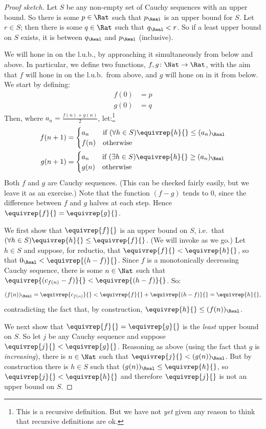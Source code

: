 \documentclass[../../../include/open-logic-section]{subfiles}
\begin{document}
\begin{proof}[Proof sketch] Let $S$ be any non-empty set of Cauchy
sequences with an upper bound. So there is some $p \in \Rat$ such that
$p_{\Real}$ is an upper bound for $S$. Let $r \in S$; then there is
some $q \in \Rat$ such that $q_{\Real} < r$. So if a least upper bound
on $S$ exists, it is between $q_\Real$ and $p_\Real$ (inclusive). 

We will hone in on the l.u.b., by approaching it simultaneously from
below and above. In particular, we define two functions, $f, g \colon
\Nat \to \Rat$, with the aim that $f$ will hone in on the l.u.b.\ from
above, and $g$ will hone on in it from below. We start by defining:
\begin{align*}
	f(0) &= p \\
	g(0) &= q
\end{align*}
Then, where $a_n = \frac{f(n) + g(n)}{2}$, let:\footnote{This is a
recursive definition. But we have not \emph{yet} given any reason to
think that recursive definitions are ok.}
\begin{align*}
	f(n+1) &=
	\begin{cases}
		a_n &\text{if }(\forall h \in S)\equivrep{h}{} \leq (a_n)_\Real\\
		f(n)&\text{otherwise}
	\end{cases}\\
	g(n+1) &=
	\begin{cases}
		a_n &\text{if }(\exists h \in S)\equivrep{h}{} \geq (a_n)_\Real\\
	 	g(n) &\text{otherwise}
	\end{cases}
\end{align*}
Both $f$ and $g$ are Cauchy sequences. (This can be checked fairly
easily, but we leave it as an exercise.) Note that the function $(f-g)$
tends to $0$, since the difference between $f$ and $g$ halves at each
step. Hence $\equivrep{f}{} = \equivrep{g}{}$. 

We first show that $\equivrep{f}{}$ is an upper bound on $S$, i.e.\ that $(\forall h \in S)\equivrep{h}{} \leq \equivrep{f}{}$.  
(We will invoke  as we go.) Let $h \in S$ and
suppose, for reductio, that $\equivrep{f}{} < \equivrep{h}{}$, so that
$0_\Real < \equivrep{(h-f)}{}$. Since $f$ is a monotonically
decreasing Cauchy sequence, there is some $n \in \Nat$ such that
$\equivrep{(c_{f(n)} - f)}{} < \equivrep{(h-f)}{}$. So:
\[
	(f(n))_\Real = \equivrep{c_{f(n)}}{} < \equivrep{f}{} + \equivrep{(h-f)}{} = \equivrep{h}{},
\]
contradicting the fact that, by construction, $\equivrep{h}{} \leq (f(n))_\Real$.

We next show that $\equivrep{f}{} = \equivrep{g}{}$ is the \emph{least} upper bound on $S$. So let $j$ be any Cauchy sequence and suppose $\equivrep{j}{} < \equivrep{g}{}$. Reasoning as above (using the fact that $g$ is \emph{increasing}), there is $n \in \Nat$ such that $\equivrep{j}{} < (g(n))_\Real$. But by construction there is $h \in S$ such that $(g(n))_\Real \leq \equivrep{h}{}$, so $\equivrep{j}{} < \equivrep{h}{}$ and therefore $\equivrep{j}{}$ is not an upper bound on $S$.  
\end{proof}
\end{document}
